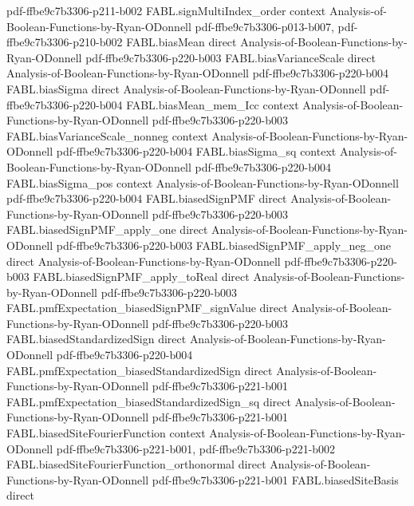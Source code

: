 \begin{theorem}
  {pdf-ffbe9c7b3306-p211-b002}
\proofstep
  {FABL.signMultiIndex_order}
  {context}
  {Analysis-of-Boolean-Functions-by-Ryan-ODonnell}
  {pdf-ffbe9c7b3306-p013-b007,
    pdf-ffbe9c7b3306-p210-b002}
\proofstep
  {FABL.biasMean}
  {direct}
  {Analysis-of-Boolean-Functions-by-Ryan-ODonnell}
  {pdf-ffbe9c7b3306-p220-b003}
\proofstep
  {FABL.biasVarianceScale}
  {direct}
  {Analysis-of-Boolean-Functions-by-Ryan-ODonnell}
  {pdf-ffbe9c7b3306-p220-b004}
\proofstep
  {FABL.biasSigma}
  {direct}
  {Analysis-of-Boolean-Functions-by-Ryan-ODonnell}
  {pdf-ffbe9c7b3306-p220-b004}
\proofstep
  {FABL.biasMean_mem_Icc}
  {context}
  {Analysis-of-Boolean-Functions-by-Ryan-ODonnell}
  {pdf-ffbe9c7b3306-p220-b003}
\proofstep
  {FABL.biasVarianceScale_nonneg}
  {context}
  {Analysis-of-Boolean-Functions-by-Ryan-ODonnell}
  {pdf-ffbe9c7b3306-p220-b004}
\proofstep
  {FABL.biasSigma_sq}
  {context}
  {Analysis-of-Boolean-Functions-by-Ryan-ODonnell}
  {pdf-ffbe9c7b3306-p220-b004}
\proofstep
  {FABL.biasSigma_pos}
  {context}
  {Analysis-of-Boolean-Functions-by-Ryan-ODonnell}
  {pdf-ffbe9c7b3306-p220-b004}
\proofstep
  {FABL.biasedSignPMF}
  {direct}
  {Analysis-of-Boolean-Functions-by-Ryan-ODonnell}
  {pdf-ffbe9c7b3306-p220-b003}
\proofstep
  {FABL.biasedSignPMF_apply_one}
  {direct}
  {Analysis-of-Boolean-Functions-by-Ryan-ODonnell}
  {pdf-ffbe9c7b3306-p220-b003}
\proofstep
  {FABL.biasedSignPMF_apply_neg_one}
  {direct}
  {Analysis-of-Boolean-Functions-by-Ryan-ODonnell}
  {pdf-ffbe9c7b3306-p220-b003}
\proofstep
  {FABL.biasedSignPMF_apply_toReal}
  {direct}
  {Analysis-of-Boolean-Functions-by-Ryan-ODonnell}
  {pdf-ffbe9c7b3306-p220-b003}
\proofstep
  {FABL.pmfExpectation_biasedSignPMF_signValue}
  {direct}
  {Analysis-of-Boolean-Functions-by-Ryan-ODonnell}
  {pdf-ffbe9c7b3306-p220-b003}
\proofstep
  {FABL.biasedStandardizedSign}
  {direct}
  {Analysis-of-Boolean-Functions-by-Ryan-ODonnell}
  {pdf-ffbe9c7b3306-p220-b004}
\proofstep
  {FABL.pmfExpectation_biasedStandardizedSign}
  {direct}
  {Analysis-of-Boolean-Functions-by-Ryan-ODonnell}
  {pdf-ffbe9c7b3306-p221-b001}
\proofstep
  {FABL.pmfExpectation_biasedStandardizedSign_sq}
  {direct}
  {Analysis-of-Boolean-Functions-by-Ryan-ODonnell}
  {pdf-ffbe9c7b3306-p221-b001}
\proofstep
  {FABL.biasedSiteFourierFunction}
  {context}
  {Analysis-of-Boolean-Functions-by-Ryan-ODonnell}
  {pdf-ffbe9c7b3306-p221-b001,
    pdf-ffbe9c7b3306-p221-b002}
\proofstep
  {FABL.biasedSiteFourierFunction_orthonormal}
  {direct}
  {Analysis-of-Boolean-Functions-by-Ryan-ODonnell}
  {pdf-ffbe9c7b3306-p221-b001}
\proofstep
  {FABL.biasedSiteBasis}
  {direct}

\end{theorem}
